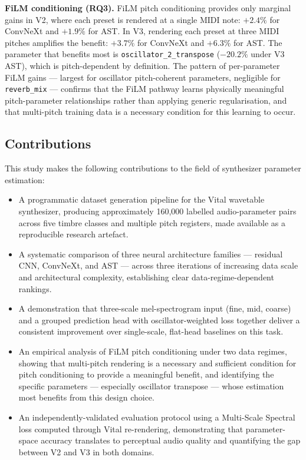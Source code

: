 \noindent \newline
\textbf{FiLM conditioning (RQ3).} FiLM pitch conditioning provides only marginal gains in V2, where each preset is rendered at a single MIDI note: $+2.4\%$ for ConvNeXt and $+1.9\%$ for AST. In V3, rendering each preset at three MIDI pitches amplifies the benefit: $+3.7\%$ for ConvNeXt and $+6.3\%$ for AST. The parameter that benefits most is \texttt{oscillator\_2\_transpose} ($-20.2\%$ under V3 AST), which is pitch-dependent by definition. The pattern of per-parameter FiLM gains — largest for oscillator pitch-coherent parameters, negligible for \texttt{reverb\_mix} — confirms that the FiLM pathway learns physically meaningful pitch-parameter relationships rather than applying generic regularisation, and that multi-pitch training data is a necessary condition for this learning to occur.

\subsection{Contributions}

\noindent
This study makes the following contributions to the field of synthesizer parameter estimation:

\begin{itemize}
    \item[$\blacksquare$] A programmatic dataset generation pipeline for the Vital wavetable synthesizer, producing approximately 160{,}000 labelled audio-parameter pairs across five timbre classes and multiple pitch registers, made available as a reproducible research artefact.

    \item[$\blacksquare$] A systematic comparison of three neural architecture families — residual CNN, ConvNeXt, and AST — across three iterations of increasing data scale and architectural complexity, establishing clear data-regime-dependent rankings.

    \item[$\blacksquare$] A demonstration that three-scale mel-spectrogram input (fine, mid, coarse) and a grouped prediction head with oscillator-weighted loss together deliver a consistent improvement over single-scale, flat-head baselines on this task.

    \item[$\blacksquare$] An empirical analysis of FiLM pitch conditioning under two data regimes, showing that multi-pitch rendering is a necessary and sufficient condition for pitch conditioning to provide a meaningful benefit, and identifying the specific parameters — especially oscillator transpose — whose estimation most benefits from this design choice.

    \item[$\blacksquare$] An independently-validated evaluation protocol using a Multi-Scale Spectral loss computed through Vital re-rendering, demonstrating that parameter-space accuracy translates to perceptual audio quality and quantifying the gap between V2 and V3 in both domains.
\end{itemize}

